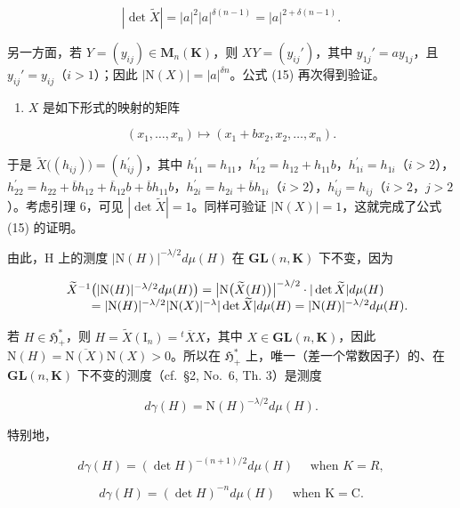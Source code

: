 \[
| \det \widetilde {X} | = | a | ^ {2} | a | ^ {\delta (n - 1)} = | a | ^ {2 + \delta (n - 1)}.
\]

另一方面，若 \(Y = (y_{ij}) \in \mathbf{M}_n(\mathbf{K})\)，则 \(XY = (y_{ij}')\)，其中 \(y_{1j}' = ay_{1j}\)，且 \(y_{ij}' = y_{ij}\)（\(i > 1\)）；因此 \(|\mathrm{N}(X)| = |a|^{\delta n}\)。公式 (15) 再次得到验证。

\begin{enumerate}
\def\labelenumi{\alph{enumi})}
\setcounter{enumi}{2}
\tightlist
\item
  \(X\) 是如下形式的映射的矩阵
\end{enumerate}

\[
\left(x _ {1}, \dots , x _ {n}\right) \mapsto \left(x _ {1} + b x _ {2}, x _ {2}, \dots , x _ {n}\right).
\]

于是 \(\widetilde{X}\big((h_{ij})\big) = (h_{ij}^{\prime})\)，其中 \(h_{11}^{\prime} = h_{11}\)，\(h_{12}^{\prime} = h_{12} + h_{11}b\)，\(h_{1i}^{\prime} = h_{1i}\)（\(i > 2\)），\(h_{22}^{\prime} = h_{22} + \overline{b}h_{12} + \overline{h}_{12}b + \overline{b}h_{11}b\)，\(h_{2i}^{\prime} = h_{2i} + \overline{b}h_{1i}\)（\(i > 2\)），\(h_{ij}^{\prime} = h_{ij}\)（\(i > 2\)，\(j > 2\)）。考虑引理 6，可见 \(|\det \widetilde{X}| = 1\)。同样可验证 \(|\mathrm{N}(X)| = 1\)，这就完成了公式 (15) 的证明。

由此，H 上的测度 \(|\mathrm{N}(H)|^{-\lambda/2}d\mu(H)\) 在 \(\mathbf{GL}(n,\mathbf{K})\) 下不变，因为

\[
\begin{array}{r l} & {\widetilde {X} ^ {- 1} \big (| \mathrm{N} (H) | ^ {- \lambda / 2} d \mu (H) \big) = \big | \mathrm{N} \big (\widetilde {X} (H) \big) \big | ^ {- \lambda / 2} \cdot | \det \widetilde {X} | d \mu (H)} \\ & {\qquad = | \mathrm{N} (H) | ^ {- \lambda / 2} | \mathrm{N} (X) | ^ {- \lambda} | \det \widetilde {X} | d \mu (H) = | \mathrm{N} (H) | ^ {- \lambda / 2} d \mu (H).} \end{array}
\]

若 \(H \in \mathfrak{H}_+^*\)，则 \(H = \widetilde{X}(\mathrm{I}_n) = {}^t\overline{X}X\)，其中 \(X \in \mathbf{GL}(n,\mathbf{K})\)，因此 \(\mathrm{N}(H) = \overline{\mathrm{N}(X)}\mathrm{N}(X) > 0\)。所以在 \(\mathfrak{H}_+^*\) 上，唯一（差一个常数因子）的、在 \(\mathbf{GL}(n,\mathbf{K})\) 下不变的测度（cf.~§2, No.~6, Th. 3）是测度

\[
d \gamma (H) = \mathrm{N} (H) ^ {- \lambda / 2} d \mu (H).
\]

特别地，

\[
d \gamma (H) = (\det H) ^ {- (n + 1) / 2} d \mu (H) \quad \text { when } K = R,
\]

\[
d \gamma (H) = (\det H) ^ {- n} d \mu (H) \quad \text { when } \mathrm{K} = \mathrm{C}.
\]


